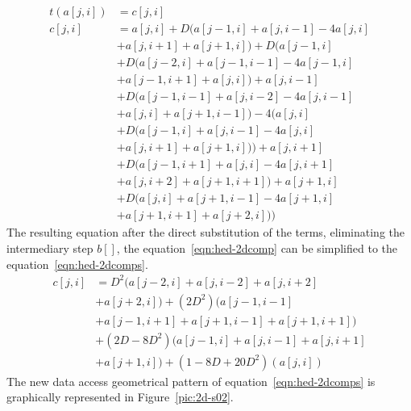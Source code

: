 \documentclass{acm_proc_article-sp}
\begin{document}
\begin{equation}
  \begin{split}
    t(a[j,i]) &= c[j,i]\\
    c[j,i] &= a[j,i] + D(a[j-1,i] + a[j,i-1] - 4a[j,i]\\
    &+ a[j,i+1] + a[j+1,i]) + D(a[j-1,i]\\
    &+ D(a[j-2,i] + a[j-1,i-1]- 4a[j-1,i]\\
    &+ a[j-1,i+1] + a[j,i]) + a[j,i-1]\\
    &+ D(a[j-1,i-1] + a[j,i-2]- 4a[j,i-1]\\
    &+ a[j,i] + a[j+1,i-1]) - 4(a[j,i]\\
    &+ D(a[j-1,i] + a[j,i-1] - 4a[j,i]\\
    &+ a[j,i+1] + a[j+1,i])) + a[j,i+1]\\
    &+ D(a[j-1,i+1] + a[j,i]- 4a[j,i+1]\\
    &+ a[j,i+2] + a[j+1,i+1]) + a[j+1,i]\\
    &+ D(a[j,i] + a[j+1,i-1]- 4a[j+1,i]\\
    &+ a[j+1,i+1] + a[j+2,i]))
  \end{split}
  \label{eqn:hed-2dcomp}
\end{equation}
The resulting equation after the direct substitution of the terms, eliminating the intermediary step $b[]$, the equation~\eqref{eqn:hed-2dcomp} can be simplified to the equation~\eqref{eqn:hed-2dcomps}.
\begin{equation}
  \begin{split}
    c[j,i] &= D^2(a[j-2,i] + a[j,i-2] + a[j,i+2]\\
    &+ a[j+2,i]) + (2D^2)(a[j-1,i-1]\\
    &+ a[j-1,i+1]+a[j+1,i-1]+a[j+1,i+1])\\
    &+ (2D-8D^2)(a[j-1,i]+a[j,i-1]+a[j,i+1]\\
    &+a[j+1,i]) + (1-8D+20D^2)(a[j,i])
  \end{split}
  \label{eqn:hed-2dcomps}
\end{equation}
The new data access geometrical pattern of equation~\eqref{eqn:hed-2dcomps} is graphically represented in Figure~\ref{pic:2d-s02}.
\end{document}
